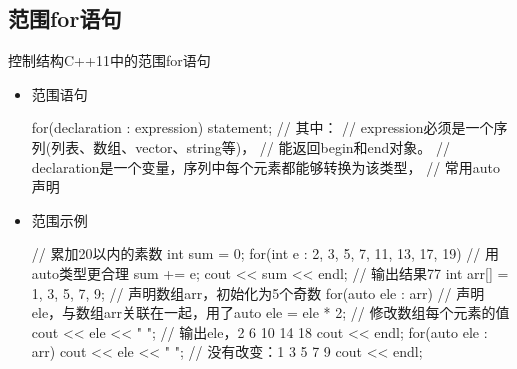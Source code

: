 \subsection[范围for语句]{范围for语句}
\begin{frame}[fragile]{控制结构}{C++11中的范围for语句}
  \stretchon
  \begin{itemize}
  \item 范围语句\\[-1ex]
    \begin{minipage}{0.95\linewidth}
      \begin{cppcode}
for(declaration : expression){
  statement;
}
// 其中：
//   expression必须是一个序列(列表、数组、vector、string等)，
//     能返回begin和end对象。
//   declaration是一个变量，序列中每个元素都能够转换为该类型，
//     常用auto声明
      \end{cppcode}
    \end{minipage}
  \item 范围示例\\[-1ex]
     \begin{minipage}{0.95\linewidth}
      \begin{cppcode}
// 累加20以内的素数
int sum = 0;
for(int e : {2, 3, 5, 7, 11, 13, 17, 19}) // 用auto类型更合理
    sum += e;
cout << sum << endl;                      // 输出结果77
int arr[] = {1, 3, 5, 7, 9};              // 声明数组arr，初始化为5个奇数
for(auto ele : arr){                      // 声明ele，与数组arr关联在一起，用了auto
  ele = ele * 2;                          // 修改数组每个元素的值
  cout << ele << " ";                     // 输出ele，2 6 10 14 18
}
cout << endl;
for(auto ele : arr)
    cout << ele << " ";                   // 没有改变：1 3 5 7 9
cout << endl;
      \end{cppcode}
    \end{minipage}
  \end{itemize}
  \stretchoff
\end{frame}

